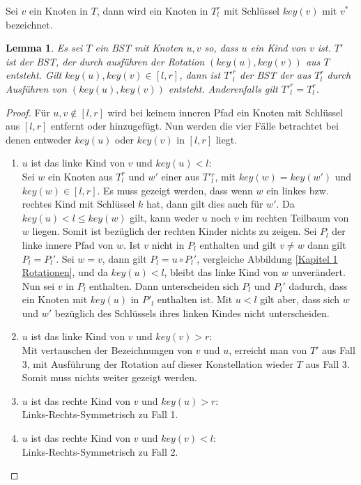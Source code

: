 \documentclass[a4paper,12pt]{article}
\begin{document}
\noindent Sei $v$ ein Knoten in $T$, dann wird ein Knoten in $T^r_l$ mit Schlüssel $\mathit{key}(v)$  mit $v^*$ bezeichnet.  
\newtheorem{Lemma3}{Lemma}[section] \label{lemmaWilber1}
\begin{Lemma3} Es sei $T$ ein BST mit Knoten $u, v$ so, dass $u$ ein Kind von $v$ ist. $T'$ ist der BST, der durch ausführen der Rotation $\left(\mathit{key}\left(u\right),\mathit{key}\left(v\right)\right)$ aus $T$ entsteht. Gilt $\mathit{key}\left(u\right),\mathit{key}\left(v\right) \in \left[l,r\right]$, dann ist ${T'}^r_l$ der BST der aus $T^r_l$ durch Ausführen von  $\left(\mathit{key}\left(u\right),\mathit{key}\left(v\right)\right)$ entsteht. Anderenfalls gilt ${T'}^r_l = T^r_l$.
\end{Lemma3}
\begin{proof}
	\noindent Für $u,v \notin \left[l,r\right]$ wird bei keinem inneren Pfad ein Knoten mit Schlüssel aus $\left[l,r\right]$ entfernt oder hinzugefügt.
	Nun werden die vier Fälle betrachtet bei denen entweder $\mathit{key}\left(u\right)$ oder $\mathit{key}\left(v\right)$ in $\left[l,r\right]$ liegt.
	\begin{enumerate}
		\item $u$ ist das linke Kind von $v$ und $\mathit{key}\left(u\right) < l$:\\
		Sei $w$ ein Knoten aus $T^r_l$ und $w'$ einer aus $T'{^r_l}$, mit $\mathit{key}(w) = \mathit{key}(w')$ und $\mathit{key}(w) \in \left[l,r\right]$. Es muss gezeigt werden, dass wenn $w$ ein linkes bzw. rechtes Kind mit Schlüssel $k$ hat, dann gilt dies auch für $w'$. Da $\mathit{key}(u) < l \leq \mathit{key}(w) $ gilt, kann weder $u$ noch $v$ im rechten Teilbaum von $w$ liegen. Somit ist bezüglich der rechten Kinder nichts zu zeigen. 
		Sei $P_l$ der linke innere Pfad von $w$. Ist $v$ nicht in $P_l$ enthalten und gilt $v \neq w$ dann gilt $P_l = P{_l}'$. Sei $w = v$, dann gilt $P_l = u  \circ  {P_l}'$, vergleiche Abbildung \ref{Kapitel 1 Rotationen}, und da $\mathit{key}(u) < l$, bleibt das linke Kind von $w$ unverändert. Nun sei $v$ in $P_l$ enthalten. Dann unterscheiden sich  $P_l$ und  ${P_l}'$ dadurch, dass ein Knoten mit $\mathit{key}(u)$ in $P'_l$ enthalten ist. Mit $u < l$ gilt aber, dass sich $w$ und $w'$ bezüglich des Schlüssels ihres linken Kindes nicht unterscheiden.
		\item $u$ ist das linke Kind von $v$ und $\mathit{key}\left(v\right) > r$:\\
		Mit vertauschen der Bezeichnungen von $v$ und $u$, erreicht man von $T'$ aus Fall 3, mit Ausführung der Rotation auf dieser Konstellation wieder $T$ aus Fall 3. Somit muss nichts weiter gezeigt werden. 
		\item $u$ ist das rechte Kind von $v$ und $\mathit{key}\left(u\right) > r$:\\
		Links-Rechts-Symmetrisch zu Fall 1. 
		\item $u$ ist das rechte Kind von $v$ und $\mathit{key}\left(v\right) < l$:\\
		Links-Rechts-Symmetrisch zu Fall 2. \\
		

\end{enumerate}
\end{proof}
\end{document}
